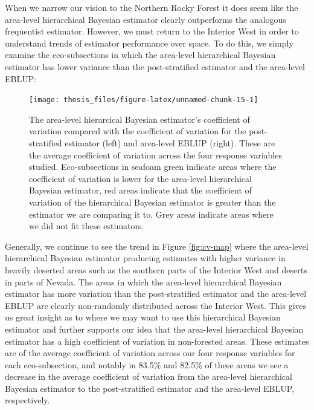 \documentclass[12pt,twoside]{reedthesis}
\begin{document}
When we narrow our vision to the Northern Rocky Forest it does seem like the area-level hierarchical Bayesian estimator clearly outperforms the analogous frequentist estimator. However, we must return to the Interior West in order to understand trends of estimator performance over space. To do this, we simply examine the eco-subsections in which the area-level hierarchical Bayesian estimator has lower variance than the post-stratified estimator and the area-level EBLUP:
\begin{figure}

{\centering \texttt{[image: thesis\_files/figure-latex/unnamed-chunk-15-1]} 

}

\caption[Area-level coefficient of variation comparison across the Interior West]{The area-level hierarcical Bayesian estimator's coefficient of variation compared with the coefficient of variation for the post-stratified estimator (left) and area-level EBLUP (right). These are the average coefficient of variation across the four response variables studied. Eco-subsections in seafoam green indicate areas where the coefficient of variation is lower for the area-level hierarchical Bayesian estimator, red areas indicate that the coefficient of variation of the hierarchical Bayesian estimator is greater than the estimator we are comparing it to. Grey areas indicate areas where we did not fit these estimators.}\label{fig:unnamed-chunk-15}
\end{figure}
Generally, we continue to see the trend in Figure \ref{fig:cv-map} where the area-level hierarchical Bayesian estimator producing estimates with higher variance in heavily deserted areas such as the southern parts of the Interior West and deserts in parts of Nevada. The areas in which the area-level hierarchical Bayesian estimator has more variation than the post-stratified estimator and the area-level EBLUP are clearly non-randomly distributed across the Interior West. This gives us great insight as to where we may want to use this hierarchical Bayesian estimator and further supports our idea that the area-level hierarchical Bayesian estimator has a high coefficient of variation in non-forested areas. These estimates are of the average coefficient of variation across our four response variables for each eco-subsection, and notably in 83.5\% and 82.5\% of these areas we see a decrease in the average coefficient of variation from the area-level hierarchical Bayesian estimator to the post-stratified estimator and the area-level EBLUP, respectively.
\end{document}
